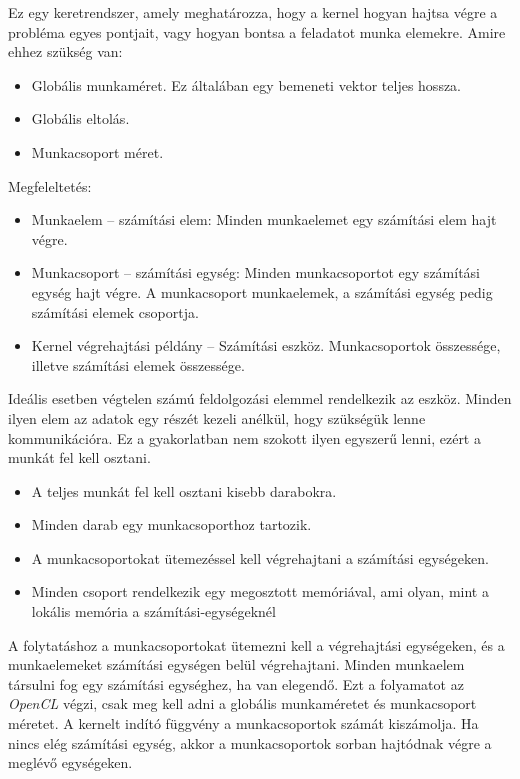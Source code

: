 Ez egy keretrendszer, amely meghatározza, hogy a kernel hogyan hajtsa végre a probléma egyes pontjait, vagy hogyan bontsa a feladatot munka elemekre.
Amire ehhez szükség van:
\begin{itemize}
\item Globális munkaméret. Ez általában egy bemeneti vektor teljes hossza.
\item Globális eltolás.
\item Munkacsoport méret.
\end{itemize}

\newpage
Megfeleltetés:
\begin{itemize}
\item Munkaelem -- számítási elem: Minden munkaelemet egy számítási elem hajt végre.
\item Munkacsoport -- számítási egység: Minden munkacsoportot egy számítási egység hajt végre. A munkacsoport munkaelemek, a számítási egység pedig számítási elemek csoportja.
\item Kernel végrehajtási példány -- Számítási eszköz. Munkacsoportok összessége, illetve számítási elemek összessége. 
\end{itemize}


Ideális esetben végtelen számú feldolgozási elemmel rendelkezik az eszköz. Minden ilyen elem az adatok egy részét kezeli anélkül, hogy szükségük lenne kommunikációra. Ez a gyakorlatban nem szokott ilyen egyszerű lenni, ezért a munkát fel kell osztani.
\begin{itemize}
\item A teljes munkát fel kell osztani kisebb darabokra.
\item Minden darab egy munkacsoporthoz tartozik.
\item A munkacsoportokat ütemezéssel kell végrehajtani a számítási egységeken.
\item Minden csoport rendelkezik egy megosztott memóriával, ami olyan, mint a lokális memória a számítási-egységeknél
\end{itemize}
A folytatáshoz a munkacsoportokat ütemezni kell a végrehajtási egységeken, és a munkaelemeket számítási egységen belül végrehajtani.
Minden munkaelem társulni fog egy számítási egységhez, ha van elegendő. Ezt a folyamatot az \textit{OpenCL} végzi, csak meg kell adni a globális munkaméretet és munkacsoport méretet. A kernelt indító függvény a  munkacsoportok számát kiszámolja. Ha nincs elég számítási egység, akkor a munkacsoportok sorban hajtódnak végre a meglévő egységeken.


